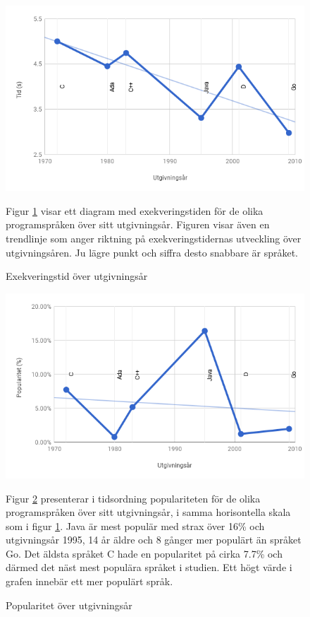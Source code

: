 \documentclass[12pt,swedish]{article}
\begin{document}
\begin{figure}[H]
\begin{center}
\includegraphics[width=1\textwidth,natwidth=600,natheight=371]{performance.png}
\caption{Exekveringstid över utgivningsår}
\label{figure:performance}
\end{center}
Figur \ref{figure:performance} visar ett diagram med exekveringstiden för de olika programspråken över sitt utgivningsår. Figuren visar även en trendlinje som anger riktning på exekveringstidernas utveckling över utgivningsåren. Ju lägre punkt och siffra desto snabbare är språket.
\end{figure}

\begin{figure}[H]
\begin{center}
\includegraphics[width=1\textwidth,natwidth=600,natheight=371]{popularity.png}
\caption{Popularitet över utgivningsår}
\label{figure:popularity}
\end{center}
Figur \ref{figure:popularity} presenterar i tidsordning populariteten för de olika programspråken över sitt utgivningsår, i samma horisontella skala som i figur \ref{figure:performance}. Java är mest populär med strax över 16\% och utgivningsår 1995, 14 år äldre och 8 gånger mer populärt än språket Go. Det äldsta språket C hade en popularitet på cirka 7.7\% och därmed det näst mest populära språket i studien. Ett högt värde i grafen innebär ett mer populärt språk.
\end{figure}
\end{document}

